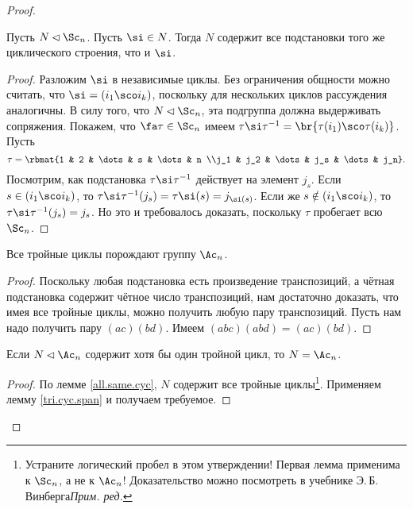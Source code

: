 \documentclass[a4paper]{article}
\begin{document}
\begin{proof}
\begin{lemma}\label{all.same.cyc}
Пусть $N \lhd \Sc_n$. Пусть $\si \in N$. Тогда $N$ содержит все подстановки  того же циклического строения,
что и $\si$.
\end{lemma}
\begin{proof}
Разложим $\si$ в независимые циклы. Без ограничения общности можно считать,  что $\si = (i_1\sco i_k)$,
поскольку для нескольких циклов рассуждения аналогичны. В силу того, что $N \lhd \Sc_n$, эта подгруппа должна
выдерживать сопряжения. Покажем, что $\fa \tau \in \Sc_n$ имеем $\tau \si \tau^{-1} = \br{\tau(i_1)\sco
\tau(i_k)}$. Пусть
$$\tau = \rbmat{1 & 2 & \dots & s & \dots & n \\j_1 & j_2 & \dots & j_s & \dots & j_n}.$$
Посмотрим, как подстановка $\tau\si\tau^{-1}$ действует на элемент $j_s$. Если $s \in (i_1\sco i_k)$,  то
$\tau\si\tau^{-1}(j_s)=\tau\si(s) = j_{\si(s)}$. Если же $s \notin (i_1\sco i_k)$, то $\tau\si\tau^{-1}(j_s)
= j_s$. Но это и требовалось доказать, поскольку $\tau$ пробегает всю $\Sc_n$.
\end{proof}

\begin{lemma}\label{tri.cyc.span}
Все тройные циклы порождают группу $\Ac_n$.
\end{lemma}
\begin{proof}
Поскольку любая подстановка есть произведение транспозиций, а чётная подстановка  содержит чётное число
транспозиций, нам достаточно доказать, что имея все тройные циклы, можно получить любую пару транспозиций.
Пусть нам надо получить пару $(ac)(bd)$. Имеем $(abc)(abd)=(ac)(bd)$.
\end{proof}

\begin{lemma}\label{one.normal}
Если $N \lhd \Ac_n$ содержит хотя бы один тройной цикл, то $N = \Ac_n$.
\end{lemma}
\begin{proof}
По лемме \ref{all.same.cyc}, $N$ содержит все тройные  циклы\footnote{Устраните логический пробел в этом
утверждении! Первая лемма применима к $\Sc_n$, а не к $\Ac_n$! Доказательство можно посмотреть в учебнике
Э.\,Б.\,Винберга\т \emph{Прим. ред.}}. Применяем лемму \ref{tri.cyc.span} и получаем требуемое.
\end{proof}


\end{proof}
\end{document}

